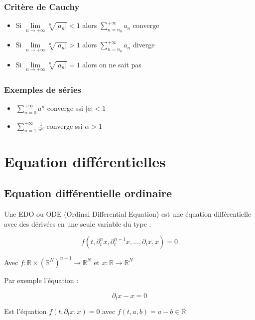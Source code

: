 \documentclass[a4paper,10pt]{article}
\newcommand{\ap}{\rightarrow}
\newcommand{\R}{\mathbb{R}}
\newcommand{\abs}[1]{\left\vert #1 \right\vert}
\newcommand{\clim}[1]{\lim\limits_{#1}}
\newcommand{\series}{\sum_{n=n_0}^{+\infty}}
\newcommand{\Series}[1]{\sum_{n=#1}^{+\infty}}
\begin{document}
\subsubsection{Critère de Cauchy}

\begin{itemize}
	\item{Si $\displaystyle \clim{n \ap +\infty} \sqrt[n]{\abs{a_n}} < 1$ alors $\displaystyle \series a_n$ converge}
	\item{Si $\displaystyle \clim{n \ap +\infty} \sqrt[n]{\abs{a_n}} > 1$ alors $\displaystyle \series a_n$ diverge}
	\item{Si $\displaystyle \clim{n \ap +\infty} \sqrt[n]{\abs{a_n}} = 1$ alors on ne sait pas}
\end{itemize}

\subsubsection{Exemples de séries}

\begin{itemize}
	\item{$\displaystyle \Series{0} a^n$ converge ssi $\abs{a} < 1$}
	\item{$\displaystyle \Series{1} \frac{1}{n^\alpha}$ converge ssi $\alpha > 1$}
\end{itemize}





\section{Equation différentielles}

\subsection{Equation différentielle ordinaire}

Une EDO ou ODE (Ordinal Differential Equation) est une équation différentielle avec des dérivées en une seule variable du type :

$$f\left(t, \partial^n_t x,\partial^{n-1}_t x,\dots,\partial_t x,x \right) = 0$$

Avec $f : \R \times (\R^N)^{n+1} \ap \R^N$ et $x : \R \ap \R^N$

Par exemple l'équation : 

$$\partial_t x - x = 0$$

Est l'équation $f(t, \partial_t x,x) = 0$ avec $f(t,a,b)=a-b \in \R$
\end{document}
